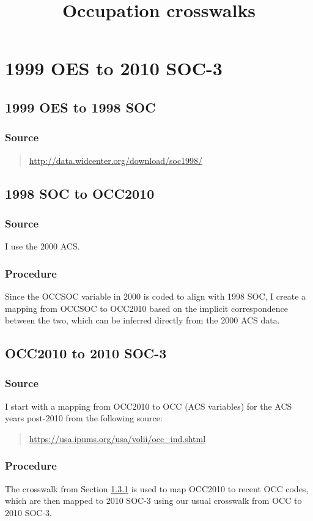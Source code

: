 \documentclass{article}
\title{Occupation crosswalks}
\author{}
\date{}
\begin{document}
\maketitle

\section{1999 OES to 2010 SOC-3}
\subsection{1999 OES to 1998 SOC}
\subsubsection{Source}
\begin{quote}
\url{http://data.widcenter.org/download/soc1998/}
\end{quote}

\subsection{1998 SOC to OCC2010}
\subsubsection{Source}
I use the 2000 ACS.

\subsubsection{Procedure}
Since the OCCSOC variable in 2000 is coded to align with 1998 SOC, I create a mapping from OCCSOC to OCC2010 based on the implicit correspondence between the two, which can be inferred directly from the 2000 ACS data.

\subsection{OCC2010 to 2010 SOC-3}
\subsubsection{Source}
\label{cwalk_occ2010_occ}
I start with a mapping from OCC2010 to OCC (ACS variables) for the ACS years post-2010 from the following source:
\begin{quote}
\url{https://usa.ipums.org/usa/volii/occ_ind.shtml}
\end{quote}

\subsubsection{Procedure}
The crosswalk from Section \ref{cwalk_occ2010_occ} is used to map OCC2010 to recent OCC codes, which are then mapped to 2010 SOC-3 using our usual crosswalk from OCC to 2010 SOC-3. 
\end{document}
